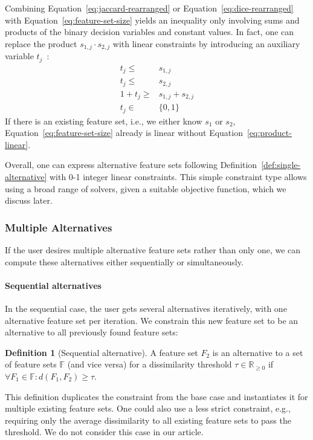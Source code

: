 \documentclass{article}
\theoremstyle{definition}
\newtheorem{definition}{Definition}
\begin{document}
%
Combining Equation~\ref{eq:jaccard-rearranged} or Equation~\ref{eq:dice-rearranged} with Equation~\ref{eq:feature-set-size} yields an inequality only involving sums and products of the binary decision variables and constant values.
In fact, one can replace the product $s_{1,j} \cdot s_{2,j}$ with linear constraints by introducing an auxiliary variable $t_j$~\cite{mosek2022modeling}:
%
\begin{equation}
	\begin{aligned}
		t_j \leq& s_{1,j} \\
		t_j \leq& s_{2,j} \\
		1 + t_j \geq& s_{1,j} + s_{2,j} \\
		t_j \in& \{0,1\}
	\end{aligned}
	\label{eq:product-linear}
\end{equation}
%
If there is an existing feature set, i.e., we either know $s_1$ or $s_2$, Equation~\ref{eq:feature-set-size} already is linear without Equation~\ref{eq:product-linear}.

Overall, one can express alternative feature sets following Definition~\ref{def:single-alternative} with 0-1 integer linear constraints.
This simple constraint type allows using a broad range of solvers, given a suitable objective function, which we discuss later.

\subsubsection{Multiple Alternatives}
\label{sec:approach:constraints:multiple}

If the user desires multiple alternative feature sets rather than only one, we can compute these alternatives either sequentially or simultaneously.

\paragraph{Sequential alternatives}

In the sequential case, the user gets several alternatives iteratively, with one alternative feature set per iteration.
We constrain this new feature set to be an alternative to all previously found feature sets:
%
\begin{definition}[Sequential alternative]
	A feature set $F_2$ is an alternative to a set of feature sets $\mathbb{F}$ (and vice versa) for a dissimilarity threshold $\tau \in \mathbb{R}_{\geq 0}$ if $\forall F_1 \in \mathbb{F}: d(F_1,F_2) \geq \tau$.
	\label{def:sequential-alternative}
\end{definition}
%
This definition duplicates the constraint from the base case and instantiates it for multiple existing feature sets.
One could also use a less strict constraint, e.g., requiring only the average dissimilarity to all existing feature sets to pass the threshold.
We do not consider this case in our article.
\end{document}
